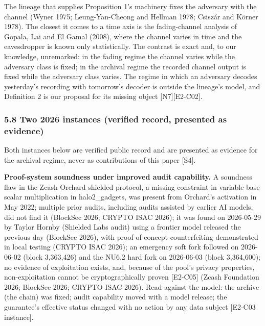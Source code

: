 \documentclass[
  11pt,
]{article}
\begin{document}
The lineage that supplies Proposition 1's machinery fixes the adversary
with the channel (Wyner 1975; Leung-Yan-Cheong and Hellman 1978; Csiszár
and Körner 1978). The closest it comes to a time axis is the
fading-channel analysis of Gopala, Lai and El Gamal (2008), where the
channel varies in time and the eavesdropper is known only statistically.
The contrast is exact and, to our knowledge, unremarked: in the fading
regime the channel varies while the adversary class is fixed; in the
archival regime the recorded channel output is fixed while the adversary
class varies. The regime in which an adversary decodes yesterday's
recording with tomorrow's decoder is outside the lineage's model, and
Definition 2 is our proposal for its missing object
{[}N7{]}{[}E2-C02{]}.

\subsubsection{5.8 Two 2026 instances (verified record, presented as
evidence)}\label{two-2026-instances-verified-record-presented-as-evidence}

Both instances below are verified public record and are presented as
evidence for the archival regime, never as contributions of this paper
{[}S4{]}.

\textbf{Proof-system soundness under improved audit capability.} A
soundness flaw in the Zcash Orchard shielded protocol, a missing
constraint in variable-base scalar multiplication in halo2\_gadgets, was
present from Orchard's activation in May 2022; multiple prior audits,
including audits assisted by earlier AI models, did not find it
(BlockSec 2026; CRYPTO ISAC 2026); it was found on 2026-05-29 by Taylor
Hornby (Shielded Labs audit) using a frontier model released the
previous day (BlockSec 2026), with proof-of-concept counterfeiting
demonstrated in local testing (CRYPTO ISAC 2026); an emergency soft fork
followed on 2026-06-02 (block 3,363,426) and the NU6.2 hard fork on
2026-06-03 (block 3,364,600); no evidence of exploitation exists, and,
because of the pool's privacy properties, non-exploitation cannot be
cryptographically proven {[}E2-C05{]} (Zcash Foundation 2026; BlockSec
2026; CRYPTO ISAC 2026). Read against the model: the archive (the chain)
was fixed; audit capability moved with a model release; the guarantee's
effective status changed with no action by any data subject {[}E2-C03
instance{]}.
\end{document}
